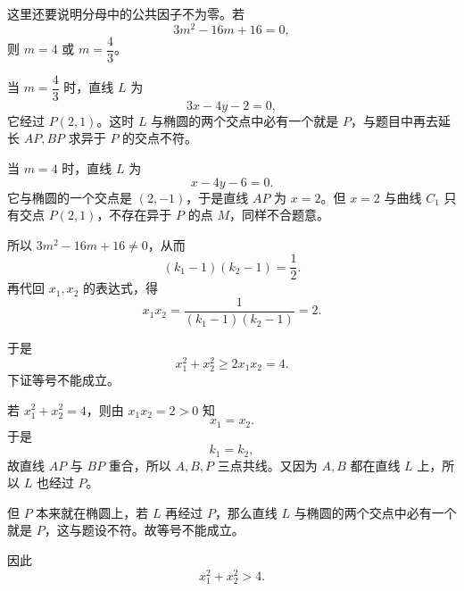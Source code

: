 \begin{solution}
这里还要说明分母中的公共因子不为零。若
\[
3m^2-16m+16=0,
\]
则 $m=4$ 或 $m=\dfrac43$。

当 $m=\dfrac43$ 时，直线 $L$ 为
\[
3x-4y-2=0,
\]
它经过 $P(2,1)$。这时 $L$ 与椭圆的两个交点中必有一个就是 $P$，与题目中再去延长 $AP,BP$ 求异于 $P$ 的交点不符。

当 $m=4$ 时，直线 $L$ 为
\[
x-4y-6=0.
\]
它与椭圆的一个交点是 $(2,-1)$，于是直线 $AP$ 为 $x=2$。但 $x=2$ 与曲线 $C_1$ 只有交点 $P(2,1)$，不存在异于 $P$ 的点 $M$，同样不合题意。

所以 $3m^2-16m+16\neq0$，从而
\[
(k_1-1)(k_2-1)=\frac12.
\]
再代回 $x_1,x_2$ 的表达式，得
\[
x_1x_2=\frac{1}{(k_1-1)(k_2-1)}=2.
\]

于是
\[
x_1^2+x_2^2\ge 2x_1x_2=4.
\]
下证等号不能成立。

若 $x_1^2+x_2^2=4$，则由 $x_1x_2=2>0$ 知
\[
x_1=x_2.
\]
于是
\[
k_1=k_2,
\]
故直线 $AP$ 与 $BP$ 重合，所以 $A,B,P$ 三点共线。又因为 $A,B$ 都在直线 $L$ 上，所以 $L$ 也经过 $P$。

但 $P$ 本来就在椭圆上，若 $L$ 再经过 $P$，那么直线 $L$ 与椭圆的两个交点中必有一个就是 $P$，这与题设不符。故等号不能成立。

因此
\[
x_1^2+x_2^2>4.
\]
\end{solution}


